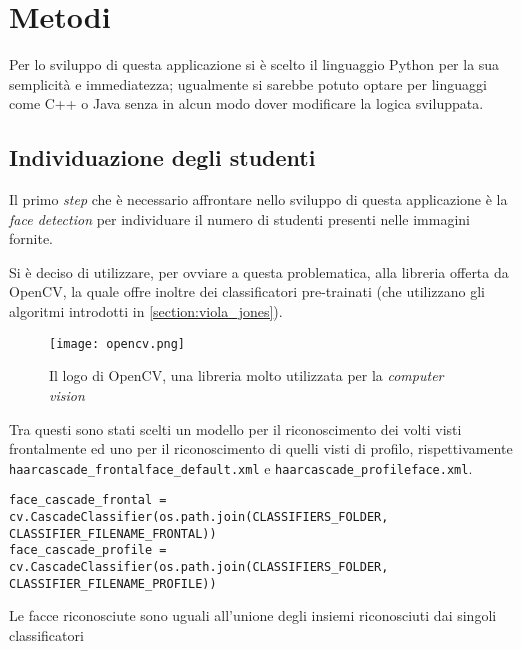 \chapter{Metodi}
\label{section:methods}

Per lo sviluppo di questa applicazione si è scelto il linguaggio Python per la sua semplicità 
e immediatezza; ugualmente si sarebbe potuto optare per linguaggi come C++ o Java senza in alcun 
modo dover modificare la logica sviluppata.

\section{Individuazione degli studenti}
\label{section:methods_face_detection}

Il primo \textit{step} che è necessario affrontare nello sviluppo di questa applicazione
è la \textit{face detection} per individuare il numero di studenti presenti nelle immagini 
fornite. 

Si è deciso di utilizzare, per ovviare a questa problematica, alla libreria offerta da OpenCV, 
la quale offre inoltre dei classificatori pre-trainati (che utilizzano gli algoritmi introdotti 
in \ref{section:viola_jones}).

\begin{figure}
    \begin{small}
        \begin{center}
            \texttt{[image: opencv.png]}
        \end{center}
        \caption{Il logo di OpenCV, una libreria molto utilizzata per la \textit{computer vision} 
            \cite{opencv}}
        \label{fig:opencv}
    \end{small}
\end{figure}

Tra questi sono stati scelti un modello per il riconoscimento dei volti visti frontalmente ed 
uno per il riconoscimento di quelli visti di profilo, rispettivamente \lstinline{haarcascade_frontalface_default.xml} 
e \lstinline{haarcascade_profileface.xml}.

\begin{verbatim}
face_cascade_frontal = cv.CascadeClassifier(os.path.join(CLASSIFIERS_FOLDER, CLASSIFIER_FILENAME_FRONTAL))
face_cascade_profile = cv.CascadeClassifier(os.path.join(CLASSIFIERS_FOLDER, CLASSIFIER_FILENAME_PROFILE))
\end{verbatim}

Le facce riconosciute sono uguali all'unione degli insiemi riconosciuti dai singoli classificatori

